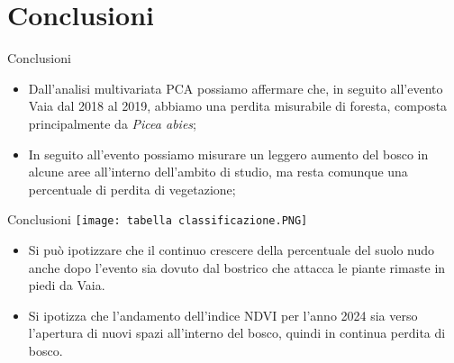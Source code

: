 \documentclass[10pt]{beamer}
\begin{document}
\section{Conclusioni}
\begin{frame}{Conclusioni}
\begin{itemize}
    \item Dall'analisi multivariata PCA possiamo affermare che, in seguito all'evento Vaia dal 2018 al 2019, abbiamo una perdita misurabile di foresta, composta principalmente da \textit{Picea abies};
    \item In seguito all'evento possiamo misurare un leggero aumento del bosco in alcune aree all'interno dell'ambito di studio, ma resta comunque una percentuale di perdita di vegetazione;
\end{itemize}
\end{frame}

\begin{frame}{Conclusioni}
\centering
\texttt{[image: tabella classificazione.PNG]} 
\begin{itemize}
    \item Si può ipotizzare che il continuo crescere della percentuale del suolo nudo anche dopo l'evento sia dovuto dal bostrico che attacca le piante rimaste in piedi da Vaia.
     \item Si ipotizza che l'andamento dell'indice NDVI per l'anno 2024 sia verso l'apertura di nuovi spazi all'interno del bosco, quindi in continua perdita di bosco. 
\end{itemize} 
\end{frame}
\end{document}
